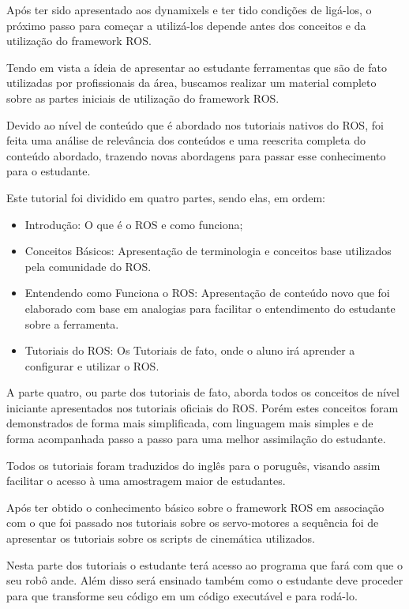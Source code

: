 Após ter sido apresentado aos dynamixels e ter tido condições de ligá-los, o próximo passo para começar a utilizá-los depende antes dos conceitos e da utilização do framework ROS.

Tendo em vista a ídeia de apresentar ao estudante ferramentas que são de fato utilizadas por profissionais da área, buscamos realizar um material completo sobre as partes iniciais de utilização do framework ROS.

Devido ao nível de conteúdo que é abordado nos tutoriais nativos do ROS, foi feita uma análise de relevância dos conteúdos e uma reescrita completa do conteúdo abordado, trazendo novas abordagens para passar esse conhecimento para o estudante.

Este tutorial foi dividido em quatro partes, sendo elas, em ordem:
\begin{itemize}
	\item Introdução: O que é o ROS e como funciona;
	\item Conceitos Básicos: Apresentação de terminologia e conceitos base utilizados pela comunidade do ROS.
	\item Entendendo como Funciona o ROS: Apresentação de conteúdo novo que foi elaborado com base em analogias para facilitar o entendimento do estudante sobre a ferramenta.
	\item Tutoriais do ROS: Os Tutoriais de fato, onde o aluno irá aprender a configurar e utilizar o ROS.
\end{itemize}

A parte quatro, ou parte dos tutoriais de fato, aborda todos os conceitos de nível iniciante apresentados nos tutoriais oficiais do ROS. Porém estes conceitos foram demonstrados de forma mais simplificada, com linguagem mais simples e de forma acompanhada passo a passo para uma melhor assimilação do estudante.

Todos os tutoriais foram traduzidos do inglês para o poruguês, visando assim facilitar o acesso à uma amostragem maior de estudantes. \cite{tutROS}

Após ter obtido o conhecimento básico sobre o framework ROS em associação com o que foi passado nos tutoriais sobre os servo-motores a sequência foi de apresentar os tutoriais sobre os scripts de cinemática utilizados.

Nesta parte dos tutoriais o estudante terá acesso ao programa que fará com que o seu robô ande. Além disso será ensinado também como o estudante deve proceder para que transforme seu código em um código executável e para rodá-lo.

